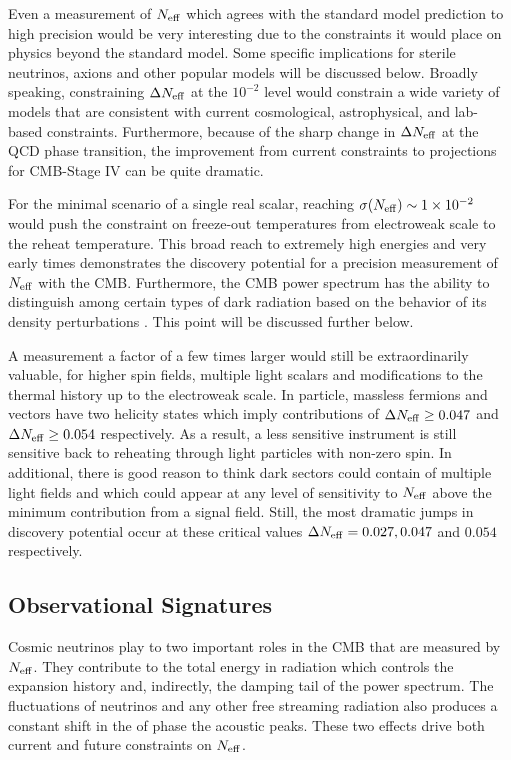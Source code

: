Even a measurement of $N_{\rm eff}$ which agrees with the standard model prediction to high precision would be very interesting due to the constraints it would place on physics beyond the standard model.  Some specific implications for sterile neutrinos, axions and other popular models will be discussed below.  Broadly speaking, constraining $\Delta N_{\rm eff}$ at the $10^{-2}$ level would constrain a wide variety of models that are consistent with current cosmological, astrophysical, and lab-based constraints.  Furthermore, because of the sharp change in $\Delta N_{\rm eff}$ at the QCD phase transition, the improvement from current constraints to projections for CMB-Stage IV can be quite dramatic.

For the minimal scenario of a single real scalar, reaching $\sigma(N_{\rm eff}) \sim 1\times 10^{-2}$ would push the constraint on freeze-out temperatures from electroweak scale to the reheat temperature.  This broad reach to extremely high energies and very early times demonstrates the discovery potential for a precision measurement of $N_{\rm eff}$ with the CMB.  Furthermore, the CMB power spectrum has the ability to distinguish among certain types of dark radiation based on the behavior of its density perturbations  \cite{Chacko:2015noa,Baumann:2015rya}.  This point will be discussed further below.

A measurement a factor of a few times larger would still be extraordinarily valuable, for higher spin fields, multiple light scalars and modifications to the thermal history up to the electroweak scale.  In particle, massless fermions and vectors have two helicity states which imply contributions of $\Delta N_{\rm eff}  \geq 0.047$ and $\Delta N_{\rm eff}  \geq 0.054$ respectively.  As a result, a less sensitive instrument is still sensitive back to reheating through light particles with non-zero spin.  In additional, there is good reason to think dark sectors could contain of multiple light fields and which could appear at any level of sensitivity to $N_{\rm eff}$ above the minimum contribution from a signal field.  Still, the most dramatic jumps in discovery potential occur at these critical values $\Delta N_{\rm eff} = 0.027, 0.047$ and $0.054$ respectively.  



\subsection{Observational Signatures}

Cosmic neutrinos play to two important roles in the CMB that are measured by $N_{\rm eff}$.  They contribute to the total energy in radiation which controls the expansion history and, indirectly, the damping tail of the power spectrum.  The fluctuations of neutrinos and any other free streaming radiation also produces a constant shift in the of phase the acoustic peaks.  These two effects drive both current and future constraints on $N_{\rm eff}$.  

